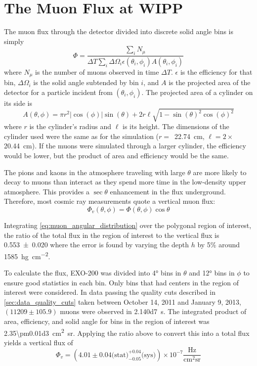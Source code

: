 \documentclass[herrin-thesis.tex]{subfiles}
\begin{document}
\section{The Muon Flux at WIPP}
\label{sec:muon_wipp}
The muon flux through the detector divided into discrete solid angle bins is simply
\begin{equation}
\label{eq:muon_fluxdef}
\Phi = \frac{\sum_{i}N_{\mu}}{ \Delta T\sum_{i}\Delta\Omega_i \epsilon(\theta_i, \phi_i) A(\theta_i, \phi_i)}
\end{equation}
where \(N_\mu\) is the number of muons observed in time \(\Delta T\). \(\epsilon\) is the efficiency for that bin, \(\Delta\Omega_i\) is the solid angle subtended by bin \(i\), and \(A\) is the projected area of the detector for a particle incident from \((\theta_i, \phi_i)\). The projected area of a cylinder on its side is
\begin{equation}
A(\theta,\phi) = \pi r^2 |\cos(\phi)|\sin(\theta) + 2 r \ell \sqrt{1-\sin(\theta)^2 \cos(\phi)^2}
\end{equation}
where \(r\) is the cylinder's radius and \(\ell\) is its height. The dimensions of the cylinder used were the same as for the simulation (\(r =\)~\SI{22.74}{\cm}, \(\ell=2\times\)\SI{20.44}{\cm}). If the muons were simulated through a larger cylinder, the efficiency would be lower, but the product of area and efficiency would be the same.

The pions and kaons in the atmosphere traveling with large \(\theta\) are more likely to decay to muons than interact as they spend more time in the low-density upper atmosphere. This provides a \(\sec\theta\) enhancement in the flux underground. Therefore, most cosmic ray measurements quote a vertical muon flux:
\begin{equation}
\label{eq:muon_vfluxdef}
\Phi_v(\theta, \phi) = \Phi(\theta, \phi)\cos\theta
\end{equation}

Integrating \cref{eq:muon_angular_distribution} over the polygonal region of interest, the ratio of the total flux in the region of interest to the vertical flux is \num{0.553\pm0.020} where the error is found by varying the depth \(h\) by 5\% around \SI{1585}{\hecto\g\per\square\cm}.

To calculate the flux, EXO-200 was divided into \ang{4} bins in \(\theta\) and \ang{12} bins in \(\phi\) to ensure good statistics in each bin. Only bins that had centers in the region of interest were considered. In data passing the quality cuts described in \cref{sec:data_quality_cuts} taken between October 14, 2011 and January 9, 2013, \((11209\pm105.9)\) muons were observed in \SI{2.140d7}{\second}. The integrated product of area, efficiency, and solid angle for bins in the region of interest was \SI{2.35\pm0.01d3}{\square\cm\steradian}. Applying the ratio above to convert this into a total flux yields a vertical flux of
\begin{equation}
\label{eq:muon_vflux_result}
\Phi_v = \left(4.01\pm0.04\text{(stat)}^{+0.04}_{-0.05}\text{(sys)}\right)\times10^{-7}\frac{\text{Hz}}{\text{cm}^2\text{sr}}
\end{equation}
\end{document}
